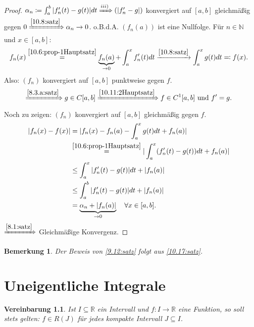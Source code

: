 \documentclass[12pt]{extreport} %
\newcommand{\N}{\mathbb{N}}
\newcommand{\R}{\mathbb{R}}
\theoremstyle{named}
\theoremstyle{dotless}
\newtheorem*{bemerkung}{Bemerkung}
\newtheorem*{vereinbarung}{Vereinbarung}
\begin{document}
\begin{proof}
	$\alpha_{n} \coloneqq \int_{a}^{b} |f_{n}'(t)- g(t)| dt \xRightarrow[]{iii)} (|f_{n}' - g|)$ konvergiert auf $[a, b]$ gleichmä{\ss}ig gegen $0 \xRightarrow[]{\ref{10.8:satz}} \alpha_{n} \rightarrow 0$. o.B.d.A. $(f_{n}(a))$ ist eine Nullfolge. Für $n \in \N$ und $x \in [a, b]$:
	$$ f_{n}(x) \overset{\ref{10.6:prop-1Hauptsatz}}{=} \underbrace{f_{n}(a)}_{\rightarrow 0} + \int_{a}^{x} f_{n}'(t) dt \xrightarrow[]{\ref{10.8:satz}} \int_{a}^{x} g(t) dt \eqqcolon f(x). $$
	Also: $(f_{n})$ konvergiert auf $[a, b]$ punktweise gegen $f$. 
	$$ \xRightarrow[]{\ref{8.3.a:satz}} g \in C[a, b] \xRightarrow[]{\ref{10.11:2Hauptsatz}} f \in C^{1}[a, b] \text{ und } f' = g. $$
	Noch zu zeigen: $(f_{n})$ konvergiert auf $[a, b]$ gleichmä{\ss}ig gegen $f$.
	\begin{align*}
		|f_{n}(x) - f(x)| & = |f_{n}(x) - f_{n}(a) - \int_{a}^{x} g(t) dt + f_{n}(a) | \\
		& \overset{\ref{10.6:prop-1Hauptsatz}}{=} |\int_{a}^{x} (f_{n}'(t) - g(t)) dt + f_{n}(a) | \\
		& \leq \int_{a}^{x} |f_{n}'(t) - g(t)| dt + |f_{n}(a)| \\
		& \leq \int_{a}^{b} |f'_{n}(t) - g(t)| dt + |f_{n}(a)| \\
		& = \underbrace{\alpha_{n} + |f_{n}(a)|}_{\rightarrow 0} \quad \forall x \in [a, b].
	\end{align*}
	$\xRightarrow[]{\ref{8.1:satz}}$ Gleichmä{\ss}ige Konvergenz.
\end{proof}


\begin{bemerkung}
	Der Beweis von \ref{9.12:satz} folgt aus \ref{10.17:satz}.	
\end{bemerkung}


\newpage


\chapter{Uneigentliche Integrale}


\begin{vereinbarung}
	Ist $I \subseteq \R$ ein Intervall und $f \colon I \rightarrow \R$ eine Funktion, so soll stets gelten: $f \in R(J)$ für jedes kompakte Intervall $J \subseteq I$.	
\end{vereinbarung}
\end{document}
